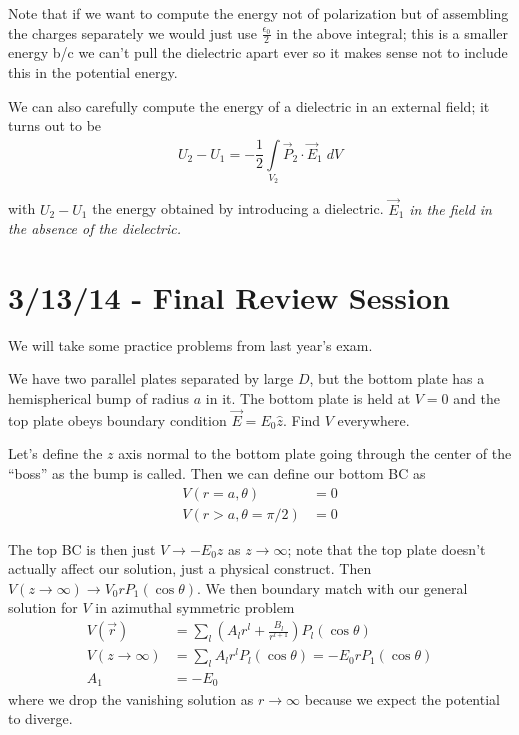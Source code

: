 \documentclass[10pt]{report}
\begin{document}
Note that if we want to compute the energy not of polarization but of assembling the charges separately we would just use $\frac{\epsilon_0}{2}$ in the above integral; this is a smaller energy b/c we can't pull the dielectric apart ever so it makes sense not to include this in the potential energy.

We can also carefully compute the energy of a dielectric in an external field; it turns out to be
\begin{equation}
    U_2 - U_1 = -\frac{1}{2}\displaystyle\int\limits_{V_2}^{}\vec{P}_2\cdot \vec{E}_1\;dV
\end{equation}

with $U_2 - U_1$ the energy obtained by introducing a dielectric. \emph{$\vec{E}_1$ in the field in the absence of the dielectric.}



\chapter{3/13/14 - Final Review Session}

We will take some practice problems from last year's exam. 

We have two parallel plates separated by large $D$, but the bottom plate has a hemispherical bump of radius $a$ in it. The bottom plate is held at $V=0$ and the top plate obeys boundary condition $\vec{E} = E_0\hat{z}$. Find $V$ everywhere. 

Let's define the $z$ axis normal to the bottom plate going through the center of the ``boss'' as the bump is called. Then we can define our bottom BC as
\begin{align}
    V(r=a,\theta) &= 0\\
    V(r > a, \theta = \pi/2) &= 0
\end{align}

The top BC is then just $V \to -E_0 z$ as $z \to \infty$; note that the top plate doesn't actually affect our solution, just a physical construct. Then $V(z\to \infty) \to V_0 rP_1(\cos\theta)$. We then boundary match with our general solution for $V$ in azimuthal symmetric problem
\begin{align}
    V(\vec{r}) &= \sum_{l}^{}\left( A_lr^l + \frac{B_l}{r^{l+1}} \right)P_l(\cos\theta)\\
    V(z \to \infty) &= \sum_{l}^{}A_lr^lP_l(\cos\theta) = -E_0rP_1(\cos\theta)\\
    A_1 &= -E_0
\end{align}
where we drop the vanishing solution as $r \to \infty$ because we expect the potential to diverge.
\end{document}
